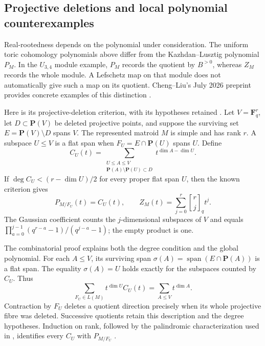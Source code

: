 \subsection{Projective deletions and local polynomial counterexamples}
\label{sec:appG-projective-deletion-KL}

Real-rootedness depends on the polynomial under consideration.
The uniform toric cohomology polynomials above differ from the
Kazhdan--Lusztig polynomial $P_M$. In the $U_{3,4}$ module example,
$P_M$ records the quotient by $B^{>0}$, whereas $Z_M$ records the
whole module. A Lefschetz map on that module does not automatically
give such a map on its quotient. Cheng--Liu's July 2026 preprint
provides concrete examples of this distinction
\cite{ChengLiu26MatroidKL}.

Here is its projective-deletion criterion, with its hypotheses
retained \cite[Theorem~1.1]{ChengLiu26MatroidKL}.
Let $V=\mathbf F_q^r$, let $D\subset\mathbf P(V)$ be deleted
projective points, and suppose the surviving set
$E=\mathbf P(V)\setminus D$ spans $V$. The represented matroid
$M$ is simple and has rank $r$. A subspace $U\le V$ is a flat
span when $F_U=E\cap\mathbf P(U)$ spans $U$. Define
\[
 C_U(t)=\sum_{\substack{U\le A\le V\\
              \mathbf P(A)\setminus\mathbf P(U)\subset D}}
              t^{\dim A-\dim U}.
\]
If $\deg C_U<(r-\dim U)/2$ for every proper flat span $U$,
then the known criterion gives
\[
 P_{M/F_U}(t)=C_U(t),\qquad
 Z_M(t)=\sum_{j=0}^r\genfrac{[}{]}{0pt}{}{r}{j}_q t^j.
\]
The Gaussian coefficient counts the $j$-dimensional subspaces
of $V$ and equals
$\prod_{a=0}^{j-1}(q^{r-a}-1)/(q^{j-a}-1)$; the empty product
is one.

The combinatorial proof explains both the degree condition and
the global polynomial. For each $A\le V$, its surviving span
$\sigma(A)=\operatorname{span}(E\cap\mathbf P(A))$ is a flat
span. The equality $\sigma(A)=U$ holds exactly for the subspaces
counted by $C_U$. Thus
\[
 \sum_{F_U\in L(M)}t^{\dim U}C_U(t)
     =\sum_{A\le V}t^{\dim A}.
\]
Contraction by $F_U$ deletes a quotient direction precisely when
its whole projective fibre was deleted. Successive quotients
retain this description and the degree hypotheses. Induction on
rank, followed by the palindromic characterization used in
, identifies every
$C_U$ with $P_{M/F_U}$
\cite[Lemmas~2.1 and~2.3 and Proposition~2.2]{ChengLiu26MatroidKL}.

